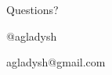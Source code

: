 \documentclass[aspectratio=43,handout,bigger]{beamer}
\begin{document}

\begin{frame}[plain]{Questions?}

\begin{center}
\Huge{@agladysh}
\end{center}

\begin{center}
\Large{agladysh@gmail.com}
\end{center}

\end{frame}

\end{document}

